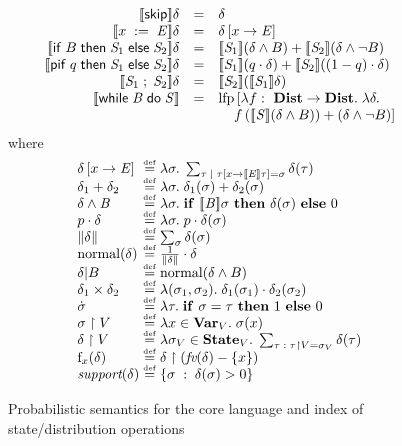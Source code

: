 \begin{figure}
\centering
\begin{displaymath}
\begin{array}{rcl}
\pevalp{\sskip}{\delta} & = & \delta \\
%
\pevalp{\sassign{x}{\aexp}}{\delta} & = & \delta \bparen{x \ra \aexp} \\
%
\pevalp{\sif{B}{\stmt_1}{\stmt_2}}{\delta} & = &
\pevalp{\stmt_1}{(\dcond{\delta}{B})} + \pevalp{\stmt_2}{(\dcond{\delta}{\neg B})} \\
%
\evalp{\spif{q}{\stmt_1}{\stmt_2}}{\delta} & = & 
\evalp{\stmt_1}{(q \cdot\delta)} + \evalp{\stmt_2}{((1-q) \cdot \delta)} \\
%
\pevalp{\sseq{\stmt_1}{\stmt_2}}{\delta} & = & \pevalp{\stmt_2}{\paren{\evalp{\stmt_1}{\delta}}} \\
\pevalp{\swhile{\bexp}{\stmt}}{} & = & \lfp\left[\lambda
f :\ \dists
\rightarrow \dists \lsep \lambda \delta \lsep \right. \\
& & \left. \quad f\paren{\pevalp{\stmt}{(\dcond{\delta}{B})}} +
       \paren{\dcond{\delta}{\neg B}}\right]
\end{array} 
\end{displaymath} 
where
\begin{displaymath}
\begin{array}{l@{\;\defeq\;}l}
\delta \bparen{x \ra \aexp} & \lambda \sigma \lsep \sum_{\tau \; | \; \tau
  \bparen{x \ra \eeval{\aexp}{\tau}} = \sigma} \delta (\tau) \\
\delta_1 + \delta_2 & \lambda \sigma \lsep \delta_1(\sigma) +
\delta_2(\sigma) \\
\dcond{\delta}{\bexp} & \lambda \sigma \lsep \aif \eeval{\bexp}{\sigma} \athen
\delta(\sigma) \aelse 0 \\
p \cdot \delta & \lambda \sigma \lsep p \cdot \delta(\sigma) \\
\pmass{\delta} & \sum_\sigma \delta(\sigma) \\
\normal{\delta} & \frac{1}{\pmass{\delta}} \cdot \delta \\
\drevise{\delta}{B} & \normal{\dcond{\delta}{B}} \\
\delta_1 \times \delta_2 & \lambda(\sigma_1, \sigma_2) \lsep
\delta_1(\sigma_1) \cdot \delta_2(\sigma_2) \\
\dot{\sigma} & \lambda \tau \lsep \aif \sigma = \tau \athen 1 \aelse
0 \\
\project{\sigma}{V} & \lambda x \in \vars_V \lsep \sigma(x)\\
\project{\delta}{V} & \lambda \sigma_V \in \states_V \lsep
\sum_{\tau \given \project{\tau}{V} = \sigma_V} \delta(\tau) \\
\forget{x}{\delta} & \project{\delta}{\paren{\fv{\delta} - \set{x}}} \\
\nzset{\delta} & \{\sigma \given \delta(\sigma) > 0\}
\end{array}
\end{displaymath}
\vspace*{-.1in}
\caption{Probabilistic semantics for the core language and index of
  state/distribution operations}
\label{fig-sem-nondet2-core}
\end{figure}

